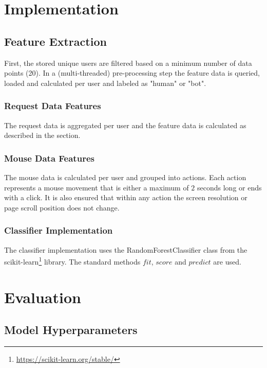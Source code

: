 \documentclass[
    fontsize=12pt,
    headings=small,
    parskip=half,           %
    bibliography=totoc,
    numbers=noenddot,       %
    open=any,               %
    final                   %
]{scrreprt}
\begin{document}
\chapter{Implementation}


\section{Feature Extraction}

First, the stored unique users are filtered based on a minimum number of data points (20). In a (multi-threaded) pre-processing step the feature data is queried, loaded and calculated per user and labeled as "human" or "bot".

\subsection{Request Data Features}

The request data is aggregated per user  and the feature data is calculated as described in the  section.

\subsection{Mouse Data Features}

The mouse data is calculated per user and grouped into actions. Each action represents a mouse movement that is either a maximum of $2$ seconds long or ends with a click. It is also ensured that within any action the screen resolution or page scroll position does not change.

\subsection{Classifier Implementation}

The classifier implementation uses the RandomForestClassifier class from the scikit-learn\footnote{\url{https://scikit-learn.org/stable/}} library. The standard methods $fit$, $score$ and $predict$ are used.



\chapter{Evaluation}

\section{Model Hyperparameters}
\end{document}

